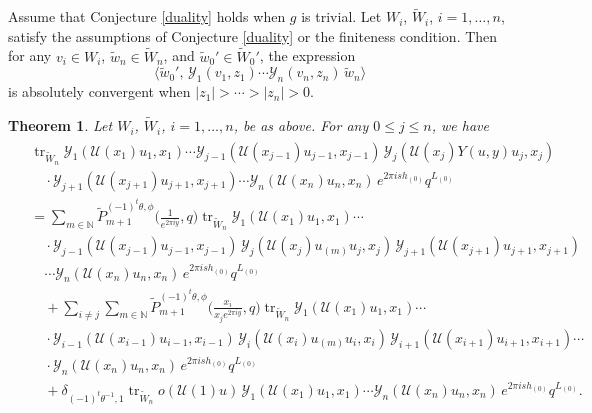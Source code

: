 \documentclass[9pt]{amsart}
\newtheorem{theorem}{Theorem}[section]
\newcommand{\Y}{\mathcal{Y}}
\begin{document}
Assume that Conjecture \ref{duality} holds 
when $g$ is trivial. Let $W_i$, $\tilde{W}_i$, $i=1,\dots,n$, satisfy the assumptions of Conjecture \ref{duality} or the finiteness condition. Then for any $v_i\in W_i$, $\tilde{w}_n\in \tilde{W}_n$, and $\tilde{w}_0' \in \tilde{W}_0'$, the expression
\[
    \langle \tilde{w}_0',\, \Y_1(v_{1},z_{1})\cdots \Y_n(v_{n},z_{n})\,\tilde{w}_n\rangle
\]
is absolutely convergent when $|z_{1}| > \cdots > |z_{n}| > 0$.

\begin{theorem}\label{iffq22}
Let $W_i$, $\tilde{W}_i$, $i=1,\dots,n$, be as above. For any $0\leq j\leq n$, we have
\begin{align}\label{iffq21}
\begin{split}
   &\operatorname{tr}_{\tilde{W}_n}\Y_1(\mathcal{U}(x_{1})u_{1},x_{1})\cdots \Y_{j-1}(\mathcal{U}(x_{j-1})u_{j-1},x_{j-1})\, \Y_j(\mathcal{U}(x_{j})Y(u,y)u_{j},x_{j})\\
   &\quad \cdot \Y_{j+1}(\mathcal{U}(x_{j+1})u_{j+1},x_{j+1})\cdots \Y_n(\mathcal{U}(x_{n})u_{n},x_{n})\,e^{2\pi i s h_{(0)}}q^{L_{(0)}}\\
   &=\sum_{m\in \mathbb{N}} \tilde{P}_{m+1}^{(-1)^{t}\theta,\phi}\biggl(\frac{1}{e^{2\pi i y}},q\biggr) \operatorname{tr}_{\tilde{W}_n}\Y_1(\mathcal{U}(x_{1})u_{1},x_{1})\cdots\\
   &\quad \cdot \Y_{j-1}(\mathcal{U}(x_{j-1})u_{j-1},x_{j-1})\,\Y_j(\mathcal{U}(x_{j})u_{(m)}u_j,x_{j})\,\Y_{j+1}(\mathcal{U}(x_{j+1})u_{j+1},x_{j+1})\\
   &\quad \cdots \Y_n(\mathcal{U}(x_{n})u_{n},x_{n})\,e^{2\pi i s h_{(0)}}q^{L_{(0)}}\\
   &\quad + \sum_{i\neq j} \sum_{m\in \mathbb{N}} \tilde{P}_{m+1}^{(-1)^{t}\theta,\phi}\biggl(\frac{x_{i}}{x_{j}e^{2\pi i y}},q\biggr) \operatorname{tr}_{\tilde{W}_n} \Y_1(\mathcal{U}(x_{1})u_{1},x_{1}) \cdots\\
   &\quad \cdot \Y_{i-1}(\mathcal{U}(x_{i-1})u_{i-1},x_{i-1})\,\Y_i(\mathcal{U}(x_{i})u_{(m)}u_{i},x_{i})\,\Y_{i+1}(\mathcal{U}(x_{i+1})u_{i+1},x_{i+1})\cdots\\
   &\quad \cdot \Y_n(\mathcal{U}(x_{n})u_{n},x_{n})\,e^{2\pi i s h_{(0)}}q^{L_{(0)}}\\
   &\quad + \delta_{(-1)^t\theta^{-1},1} \operatorname{tr}_{\tilde{W}_n}o(\mathcal{U}(1)u)\, \Y_1(\mathcal{U}(x_{1})u_{1},x_{1}) \cdots \Y_n(\mathcal{U}(x_{n})u_{n},x_{n})\,e^{2\pi i s h_{(0)}}q^{L_{(0)}}.
\end{split}
\end{align}
\end{theorem}
\end{document}
